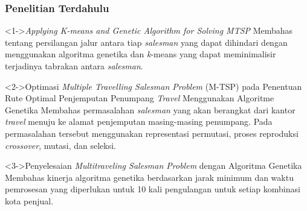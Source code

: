 \begin{frame}
\frametitle{Penelitian Terdahulu}
\begin{block}<1->{\textit{Applying K-means and Genetic Algorithm for Solving MTSP}}
Membahas tentang persilangan jalur antara tiap \textit{salesman} yang dapat dihindari dengan menggunakan algoritma genetika dan \textit{k}-means yang dapat meminimalisir terjadinya tabrakan antara \textit{salesman}.
\end{block}

\begin{block}<2->{Optimasi \textit{Multiple Travelling Salesman Problem} (M-TSP) pada Penentuan Rute Optimal Penjemputan Penumpang \textit{Travel} Menggunakan Algoritme Genetika}
Membahas permasalahan \textit{salesman} yang akan berangkat dari kantor \textit{travel} menuju ke alamat penjemputan masing-masing penumpang. Pada permasalahan tersebut menggunakan representasi permutasi, proses reproduksi \textit{crossover}, mutasi, dan seleksi.
\end{block}

\begin{block}<3->{Penyelesaian \textit{Multitraveling Salesman Problem} dengan Algoritma Genetika}
Membahas kinerja algoritma genetika berdasarkan jarak minimum dan waktu pemrosesan yang diperlukan untuk 10 kali pengulangan untuk setiap kombinasi kota penjual.
\end{block}
\end{frame}